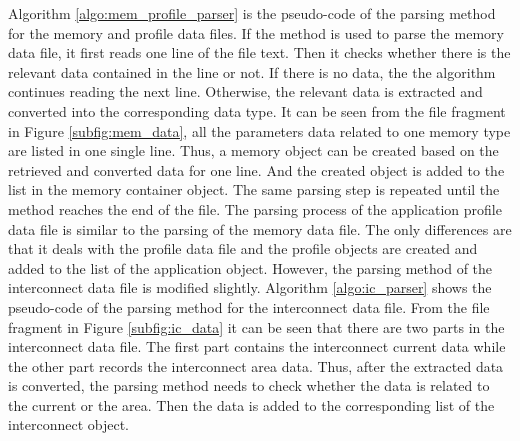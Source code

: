 	
	
	Algorithm \ref{algo:mem_profile_parser} is the pseudo-code of
	the parsing method for the memory and profile data files. If the method is
	used to parse the memory data file, it first reads one line of the file text.
	Then it checks whether there is the relevant data contained in the line or not.
	If there is no data, the the algorithm continues reading the next line.
	Otherwise, the relevant data is extracted and converted into the corresponding
	data type.
	It can be seen from the file fragment in Figure \ref{subfig:mem_data}, all the
	parameters data related to one memory type are listed in one single line.
	Thus, a memory object can be created based on the retrieved and converted data
	for one line. And the created object is added to the list in the memory container
	object. The same parsing step is repeated until the method reaches the end of
	the file. The parsing process of the application profile data file is similar
	to the parsing of the memory data file.
	The only differences are that it deals with the profile data file and the
	profile objects are created and added to the list of the application object.
	However, the parsing method of the interconnect data file is modified slightly.
	Algorithm \ref{algo:ic_parser} shows the pseudo-code of the parsing method for
	the interconnect data file.
	From the file fragment in Figure \ref{subfig:ic_data} it can be seen that there
	are two parts in the interconnect data file.
	The first part contains the interconnect current data while the other part
	records the interconnect area data. Thus, after the extracted data is converted,
	the parsing method needs to check whether the data is related to the current or
	the area. Then the data is added to the corresponding list of the interconnect
	object.
	
	
	
